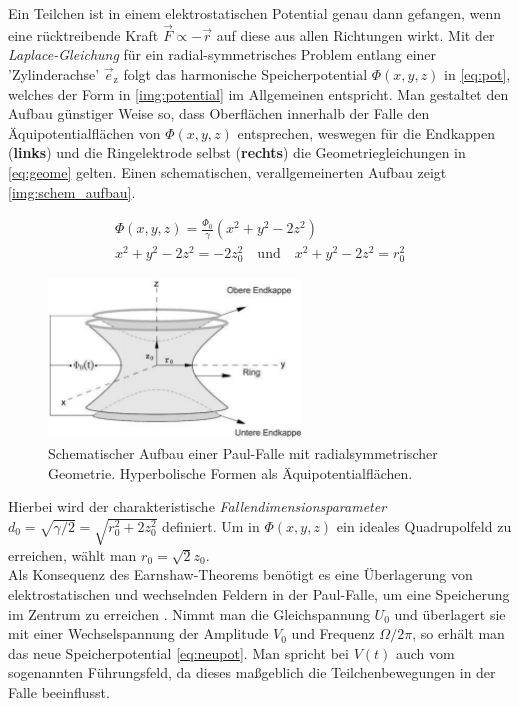 \documentclass[numbers=noenddot,a4paper,notitlepage,twoside,BCOR15mm]{scrartcl}
\newcommand{\ix}[1]{_\text{#1}}
\newcommand{\tilt}[1]{\textit{#1}}
\newcommand{\fett}[1]{\textbf{#1}}
\begin{document}
			Ein Teilchen ist in einem elektrostatischen Potential genau dann gefangen, wenn eine rücktreibende Kraft $\vec{F}\propto-\vec{r}$ auf diese aus allen Richtungen wirkt. Mit der \tilt{Laplace-Gleichung} für ein radial-symmetrisches Problem entlang einer 'Zylinderachse' $\vec{e}\ix{z}$ folgt das harmonische Speicherpotential $\Phi(x,y,z)$ in \autoref{eq:pot}, welches der Form in \autoref{img:potential} im Allgemeinen entspricht. Man gestaltet den Aufbau günstiger Weise so, dass Oberflächen innerhalb der Falle den Äquipotentialflächen von $\Phi(x,y,z)$ entsprechen, weswegen für die Endkappen (\fett{links}) und die Ringelektrode selbst (\fett{rechts}) die Geometriegleichungen in \autoref{eq:geome} gelten. Einen schematischen, verallgemeinerten Aufbau zeigt \autoref{img:schem_aufbau}.

				\begin{align}
					\Phi(x,y,z)=\frac{\Phi\ix{0}}{\gamma}(x^2+y^2-2z^2) \label{eq:pot} \\
					x^2+y^2-2z^2=-2z\ix{0}^2 \quad\text{und}\quad x^2+y^2-2z^2=r\ix{0}^2 \label{eq:geome}
				\end{align}

				\begin{figure}[t]
					\centering
					\includegraphics[width=0.6\textwidth]{paul_schema.png}
					\caption{Schematischer Aufbau einer Paul-Falle mit radialsymmetrischer Geometrie. Hyperbolische Formen als Äquipotentialflächen. \cite{EMAUGreifswaldPaul}}\label{img:schem_aufbau}
				\end{figure}

		Hierbei wird der charakteristische \tilt{Fallendimensionsparameter} $d\ix{0}=\sqrt{\gamma/2}=\sqrt{r\ix{0}^2+2z\ix{0}^2}$ definiert. Um in $\Phi(x,y,z)$ ein ideales Quadrupolfeld zu erreichen, wählt man $r\ix{0}=\sqrt{2}z\ix{0}$.\\
		Als Konsequenz des Earnshaw-Theorems benötigt es eine Überlagerung von elektrostatischen und wechselnden Feldern in der Paul-Falle, um eine Speicherung im Zentrum zu erreichen \cite{EarnPaul} \cite{Paul}. Nimmt man die Gleichspannung $U\ix{0}$ und überlagert sie mit einer Wechselspannung der Amplitude $V\ix{0}$ und Frequenz $\Omega/2\pi$, so erhält man das neue Speicherpotential \autoref{eq:neupot}. Man spricht bei $V(t)$ auch vom sogenannten Führungsfeld, da dieses maßgeblich die Teilchenbewegungen in der Falle beeinflusst.
\end{document}

